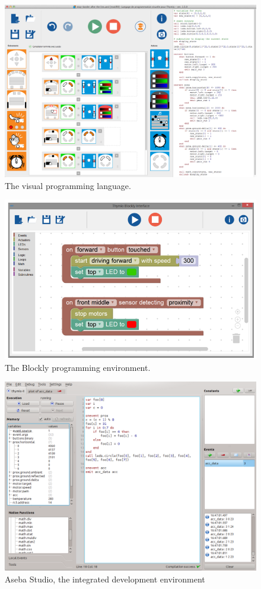 \documentclass[letterpaper, 10 pt, conference]{ieeeconf}  %
\begin{document}
\begin{figure}
\centering
\includegraphics[width=.9\columnwidth]{figures/vpl}
\caption{The visual programming language.}
\label{fig:vpl}
\end{figure}

\begin{figure}
\centering
\includegraphics[width=.9\columnwidth]{figures/blockly}
\caption{The Blockly programming environment.}
\label{fig:blockly}
\end{figure}

\begin{figure}
\centering
\includegraphics[width=.9\columnwidth]{figures/aseba-studio}
\caption{Aseba Studio, the integrated development environment}
\label{fig:aseba-studio}
\end{figure}
\end{document}

